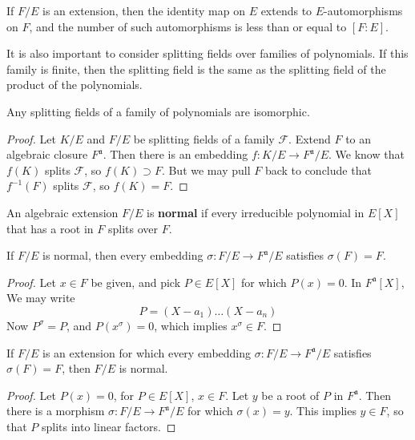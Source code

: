 \begin{corollary}
    If $F/E$ is an extension, then the identity map on $E$ extends to $E$-automorphisms on $F$, and the number of such automorphisms is less than or equal to $[F:E]$.
\end{corollary}

It is also important to consider splitting fields over families of polynomials. If this family is finite, then the splitting field is the same as the splitting field of the product of the polynomials.

\begin{theorem}
    Any splitting fields of a family of polynomials are isomorphic.
\end{theorem}
\begin{proof}
    Let $K/E$ and $F/E$ be splitting fields of a family $\mathcal{F}$. Extend $F$ to an algebraic closure $F^{\mathfrak{a}}$. Then there is an embedding $f:K/E \to F^{\mathfrak{a}}/E$. We know that $f(K)$ splits $\mathcal{F}$, so $f(K) \supset F$. But we may pull $F$ back to conclude that $f^{-1}(F)$ splits $\mathcal{F}$, so $f(K) = F$.
\end{proof}

An algebraic extension $F/E$ is {\bf normal} if every irreducible polynomial in $E[X]$ that has a root in $F$ splits over $F$.

\begin{lemma}
    If $F/E$ is normal, then every embedding $\sigma:F/E \to F^{\mathfrak{a}}/E$ satisfies $\sigma(F) = F$.
\end{lemma}
\begin{proof}
    Let $x \in F$ be given, and pick $P \in E[X]$ for which $P(x) = 0$. In $F^{\mathfrak{a}}[X]$, We may write
    \[ P = (X - a_1) \dots (X - a_n) \]
    Now $P^\sigma = P$, and $P(x^\sigma) = 0$, which implies $x^\sigma \in F$.
\end{proof}

\begin{theorem}
    If $F/E$ is an extension for which every embedding $\sigma:F/E \to F^{\mathfrak{a}}/E$ satisfies $\sigma(F) = F$, then $F/E$ is normal.
\end{theorem}
\begin{proof}
    Let $P(x) = 0$, for $P \in E[X]$, $x \in F$. Let $y$ be a root of $P$ in $F^{\mathfrak{a}}$. Then there is a morphism $\sigma: F/E \to F^{\mathfrak{a}}/E$ for which $\sigma(x) = y$. This implies $y \in F$, so that $P$ splits into linear factors.
\end{proof}

